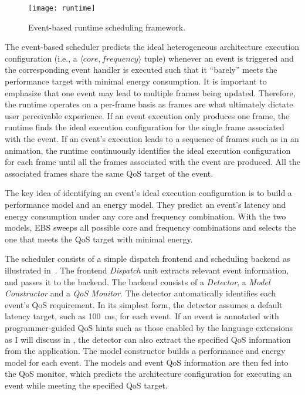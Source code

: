 \begin{figure*}[t]
\centering
\texttt{[image: runtime]}
\caption{Event-based runtime scheduling framework.}
\label{fig:runtime}
\end{figure*}
\label{sec:runtime:overview}

The event-based scheduler predicts the ideal heterogeneous architecture execution configuration (i.e., a $\langle core, frequency \rangle$ tuple) whenever an event is triggered and the corresponding event handler is executed such that it ``barely'' meets the performance target with minimal energy consumption. It is important to emphasize that one event may lead to multiple frames being updated. Therefore, the \greenweb runtime operates on a per-frame basis as frames are what ultimately dictate user perceivable experience. If an event execution only produces one frame, the runtime finds the ideal execution configuration for the single frame associated with the event. If an event's execution leads to a sequence of frames such as in an animation, the runtime continuously identifies the ideal execution configuration for each frame until all the frames associated with the event are produced. All the associated frames share the same QoS target of the event.

The key idea of identifying an event's ideal execution configuration is to build a performance model and an energy model. They predict an event's latency and energy consumption under any core and frequency combination. With the two models, EBS sweeps all possible core and frequency combinations and selects the one that meets the QoS target with minimal energy.

The scheduler consists of a simple dispatch frontend and scheduling backend as illustrated in~. The frontend \textit{Dispatch} unit extracts relevant event information, and passes it to the backend. The backend consists of a \textit{Detector}, a \textit{Model Constructor} and a \textit{QoS Monitor}. The detector automatically identifies each event's QoS requirement. In its simplest form, the detector assumes a default latency target, such as 100~ms, for each event. If an event is annotated with programmer-guided QoS hints such as those enabled by the \greenweb language extensions as I will discuss in , the detector can also extract the specified QoS information from the application. The model constructor builds a performance and energy model for each event. The models and event QoS information are then fed into the QoS monitor, which predicts the architecture configuration for executing an event while meeting the specified QoS target.

